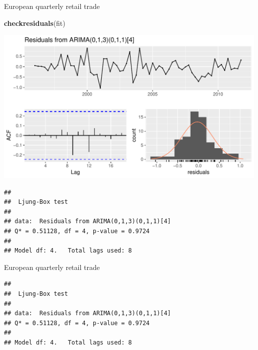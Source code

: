 \documentclass[14pt,ignorenonframetext,]{beamer}
\newenvironment{Shaded}{\begin{snugshade}}{\end{snugshade}}
\newcommand{\KeywordTok}[1]{\textcolor[rgb]{0.13,0.29,0.53}{\textbf{#1}}}
\newcommand{\NormalTok}[1]{#1}
\begin{document}
\begin{frame}[fragile]{European quarterly retail trade}

\fontsize{13}{15}\sf

\begin{Shaded}
\begin{Highlighting}[]
\KeywordTok{checkresiduals}\NormalTok{(fit)}
\end{Highlighting}
\end{Shaded}

\includegraphics{week_5_arima_files/figure-beamer/unnamed-chunk-49-1.pdf}

\begin{verbatim}
## 
##  Ljung-Box test
## 
## data:  Residuals from ARIMA(0,1,3)(0,1,1)[4]
## Q* = 0.51128, df = 4, p-value = 0.9724
## 
## Model df: 4.   Total lags used: 8
\end{verbatim}

\end{frame}

\begin{frame}[fragile]{European quarterly retail trade}

\fontsize{13}{15}\sf

\begin{verbatim}
## 
##  Ljung-Box test
## 
## data:  Residuals from ARIMA(0,1,3)(0,1,1)[4]
## Q* = 0.51128, df = 4, p-value = 0.9724
## 
## Model df: 4.   Total lags used: 8
\end{verbatim}

\end{frame}
\end{document}
